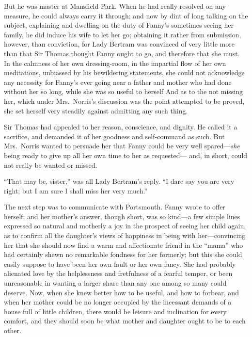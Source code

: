 \documentclass{article}
\begin{document}
But he was master at Mansfield Park.  When he had really
resolved on any measure, he could always carry it through;
and now by dint of long talking on the subject,
explaining and dwelling on the duty of Fanny's sometimes
seeing her family, he did induce his wife to let her go;
obtaining it rather from submission, however, than conviction,
for Lady Bertram was convinced of very little more than
that Sir Thomas thought Fanny ought to go, and therefore
that she must.  In the calmness of her own dressing-room,
in the impartial flow of her own meditations, unbiassed by
his bewildering statements, she could not acknowledge any
necessity for Fanny's ever going near a father and mother
who had done without her so long, while she was so useful
to herself And as to the not missing her, which under
Mrs.\ Norris's discussion was the point attempted to be proved,
she set herself very steadily against admitting any such thing.

Sir Thomas had appealed to her reason, conscience, and dignity.
He called it a sacrifice, and demanded it of her goodness
and self-command as such.  But Mrs.\ Norris wanted to persuade
her that Fanny could be very well spared---\emph{she} being
ready to give up all her own time to her as requested---%
and, in short, could not really be wanted or missed.

``That may be, sister,'' was all Lady Bertram's reply.
``I dare say you are very right; but I am sure I shall miss
her very much.''

The next step was to communicate with Portsmouth.  Fanny wrote
to offer herself; and her mother's answer, though short,
was so kind---a few simple lines expressed so natural and
motherly a joy in the prospect of seeing her child again,
as to confirm all the daughter's views of happiness in
being with her---convincing her that she should now find
a warm and affectionate friend in the ``mama'' who had
certainly shewn no remarkable fondness for her formerly;
but this she could easily suppose to have been her own
fault or her own fancy.  She had probably alienated love
by the helplessness and fretfulness of a fearful temper,
or been unreasonable in wanting a larger share than
any one among so many could deserve.  Now, when she
knew better how to be useful, and how to forbear,
and when her mother could be no longer occupied by the
incessant demands of a house full of little children,
there would be leisure and inclination for every comfort,
and they should soon be what mother and daughter ought
to be to each other.
\end{document}

